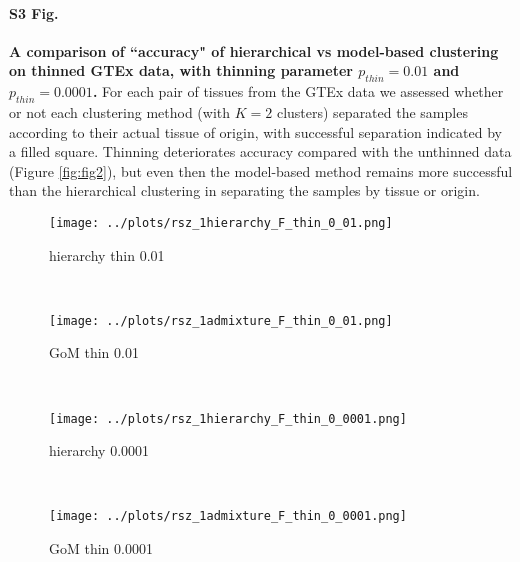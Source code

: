 \paragraph*{S3 Fig.}
\label{figS2}
{\bf A comparison of ``accuracy" of hierarchical vs model-based clustering on thinned GTEx data, with thinning parameter $p_{thin}=0.01$ and $p_{thin}=0.0001$.}  For each pair of tissues from the GTEx data we assessed whether or not each clustering method (with $K=2$ clusters) separated the samples according to their actual tissue of origin, with successful separation indicated by a filled square. Thinning deteriorates accuracy compared with the unthinned data (Figure \ref{fig:fig2}), but even then the model-based method remains more successful than the hierarchical clustering in separating the samples by tissue or origin.
 \begin{figure*}[ht]
    \centering    
     \begin{subfigure}[t]{0.5\textwidth}
        \centering
        \texttt{[image: ../plots/rsz\_1hierarchy\_F\_thin\_0\_01.png]}
        \caption{hierarchy thin 0.01}
    \end{subfigure}%
    ~
    \begin{subfigure}[t]{0.5\textwidth}
        \centering
        \texttt{[image: ../plots/rsz\_1admixture\_F\_thin\_0\_01.png]}
        \caption{GoM thin 0.01}
    \end{subfigure}\\
    
     \begin{subfigure}[t]{0.5\textwidth}
        \centering
        \texttt{[image: ../plots/rsz\_1hierarchy\_F\_thin\_0\_0001.png]}
        \caption{hierarchy 0.0001}
    \end{subfigure}%
    ~
    \begin{subfigure}[t]{0.5\textwidth}
        \centering
        \texttt{[image: ../plots/rsz\_1admixture\_F\_thin\_0\_0001.png]}
        \caption{GoM thin 0.0001}
    \end{subfigure}\\
\end{figure*}
\clearpage
